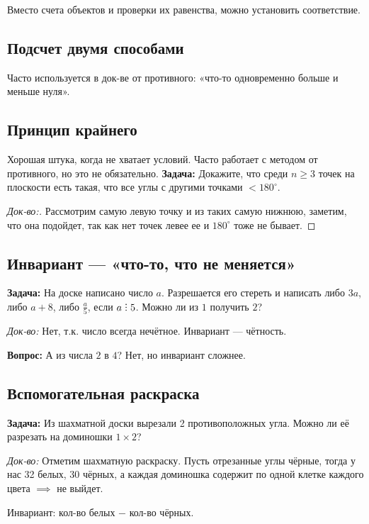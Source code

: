 \documentclass[10pt, a4paper]{article}
\def\divby{%
  \mathrel{\text{\vbox{\baselineskip.65ex\lineskiplimit0pt\hbox{.}\hbox{.}\hbox{.}}}}%
}
\begin{document}
Вместо счета объектов и проверки их равенства, можно установить соответствие.

\subsection*{Подсчет двумя способами}
Часто используется в док-ве от противного: «что-то одновременно больше и меньше нуля».

\subsection*{Принцип крайнего}

Хорошая штука, когда не хватает условий. Часто работает с методом от противного, но это не обязательно.
\noindent        
\textbf{Задача:} Докажите, что среди $n\ge 3$ точек на плоскости есть такая, что все углы с другими точками $<180^\circ$. 
\begin{proof}[Док-во:]
    Рассмотрим самую левую точку и из таких самую нижнюю, заметим, что она подойдет, так как нет точек левее ее и $180^\circ$ тоже не бывает. 
\end{proof}

\subsection*{Инвариант --- «что-то, что не меняется»}

\textbf{Задача:} На доске написано число $a$. Разрешается его стереть и написать либо $3a$, либо $a+8$, либо $\frac{a}{5}$, если $a \divby 5$. Можно ли из $1$ получить $2$?

\noindent \textit{Док-во:} Нет, т.к. число всегда нечётное. Инвариант --- чётность.

\noindent \textbf{Вопрос:} А из числа $2$ в $4$? Нет, но инвариант сложнее.

\subsection*{Вспомогательная раскраска}

\textbf{Задача:} Из шахматной доски вырезали 2 противоположных угла. Можно ли её разрезать на доминошки $1 \times 2$?

\noindent \textit{Док-во:} Отметим шахматную раскраску. Пусть отрезанные углы чёрные, тогда у нас 32 белых, 30 чёрных, а каждая доминошка содержит по одной клетке каждого цвета $\implies$ не выйдет.

\noindent Инвариант: кол-во белых $-\,\, \text{кол-во}$ чёрных.
\end{document}
